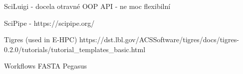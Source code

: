 SciLuigi
- docela otravné OOP API
- ne moc flexibilní

SciPipe
- https://scipipe.org/

Tigres (used in E-HPC)
https://dst.lbl.gov/ACSSoftware/tigres/docs/tigres-0.2.0/tutorials/tutorial_templates_basic.html


Workflows
FASTA
Pegasus
